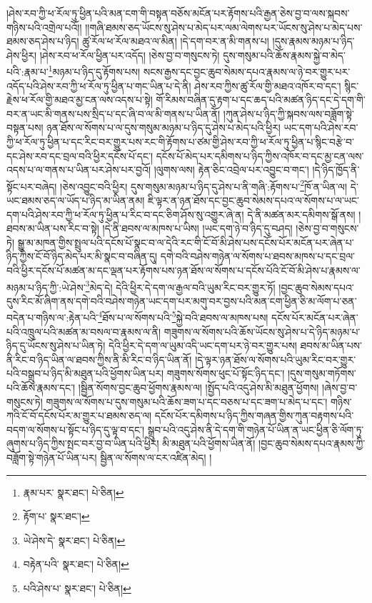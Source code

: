 །ཤེས་རབ་ཀྱི་ཕ་རོལ་ཏུ་ཕྱིན་པའི་མན་ངག་གི་བསྟན་བཅོས་མངོན་པར་རྟོགས་པའི་རྒྱན་ཅེས་བྱ་བ་ལས་སྐབས་གཉིས་པའི་འགྲེལ་པའོ།། །།གཞི་ཐམས་ཅད་ཡོངས་སུ་ཤེས་པ་མེད་པར་ལམ་ལེགས་པར་ཡོངས་སུ་ཤེས་པ་མེད་པས་ཐམས་ཅད་ཤེས་པ་ཉིད། ཚུ་རོལ་ཕ་རོལ་མཐའ་ལ་མིན། །དེ་དག་བར་ན་མི་གནས་པ། །དུས་རྣམས་མཉམ་པ་ཉིད་ཤེས་ཕྱིར། །ཤེས་རབ་ཕ་རོལ་ཕྱིན་པར་འདོད། །ཅེས་བྱ་བ་གསུངས་ཏེ། དུས་གསུམ་པའི་ཆོས་རྣམས་སྐྱེ་བ་མེད་པའི་:རྣམ་པ་\footnote{རྣམ་པར་  སྣར་ཐང་།  པེ་ཅིན། }མཉམ་པ་ཉིད་དུ་རྟོགས་པས། སངས་རྒྱས་དང་བྱང་ཆུབ་སེམས་དཔའ་རྣམས་ལ་ཉེ་བར་གྱུར་པར་འདོད་པའི་ཤེས་རབ་ཀྱི་ཕ་རོལ་ཏུ་ཕྱིན་པ་གང་ཡིན་པ་དེ་ནི། ཤེས་རབ་ཀྱིས་ཚུ་རོལ་གྱི་མཐའ་འཁོར་བ་དང་། སྙིང་རྗེས་ཕ་རོལ་གྱི་མཐའ་མྱ་ངན་ལས་འདས་པ་སྟེ། གོ་རིམས་བཞིན་དུ་རྟག་པ་དང་ཆད་པའི་མཚན་ཉིད་དང་དེ་དག་གི་བར་ན་ཡང་མི་གནས་པས་སྲིད་པ་དང་ཞི་བ་ལ་མི་གནས་པ་ཡིན་ནོ། །ཀུན་ཤེས་པ་ཉིད་ཀྱི་སྐབས་ལས་བཟློག་སྟེ་བསྟན་པས། ཉན་ཐོས་ལ་སོགས་པ་ལ་དུས་གསུམ་མཉམ་པ་ཉིད་དུ་ཤེས་པ་མེད་པའི་ཕྱིར། ཡང་དག་པའི་ཤེས་རབ་ཀྱི་ཕ་རོལ་ཏུ་ཕྱིན་པ་དང་རིང་བར་གྱུར་པས་རང་གི་རྟོགས་པ་ཙམ་གྱི་ཤེས་རབ་ཀྱི་ཕ་རོལ་ཏུ་ཕྱིན་པ་སྙིང་བརྩེ་བ་དང་ཤེས་རབ་དང་བྲལ་བའི་ཕྱིར་དངོས་པོ་དང་། དངོས་པོ་མེད་པར་དམིགས་པ་ཉིད་ཀྱིས་འཁོར་བ་དང་མྱ་ངན་ལས་འདས་པ་ལ་གནས་པ་ཡིན་པར་ཤེས་པར་བྱའོ། །ལུགས་ལས། རྟེན་ཅིང་འབྲེལ་པར་འབྱུང་བ་གང་། །དེ་ཉིད་ཁྱོད་ནི་སྟོང་པར་བཞེད། །ཅེས་འབྱུང་བའི་ཕྱིར། དུས་གསུམ་མཉམ་པ་ཉིད་དུ་ཤེས་པ་ནི་གཞི་:རྟོགས་པ་\footnote{རྟོག་པ་  སྣར་ཐང་། }ཁོ་ན་ཡིན་ལ། དེ་ཡང་ཐམས་ཅད་ལ་ཡོད་པ་ཉིད་མ་ཡིན་ནམ། ཇི་ལྟར་ན་ཉན་ཐོས་དང་བྱང་ཆུབ་སེམས་དཔའ་ལ་སོགས་པ་ལ་ཡང་དག་པའི་ཤེས་རབ་ཀྱི་ཕ་རོལ་ཏུ་ཕྱིན་པ་རིང་བ་དང་ཅིག་ཤོས་སུ་འགྱུར་ཞེ་ན། དེ་ནི་མཚན་མར་དམིགས་སྒོ་ནས། །ཐབས་མ་ཡིན་པས་རིང་བ་སྟེ། །དེ་ནི་ཐབས་ལ་མཁས་པ་ཡིས། །ཡང་དག་ཉེ་བ་ཉིད་དུ་བཤད། །ཅེས་བྱ་བ་གསུངས་ཏེ། སྒྱུ་མ་མཁན་གྱིས་སྤྲུལ་པའི་དངོས་པོ་སྣང་བ་ལ་དེའི་རང་གི་ངོ་བོ་མི་ཤེས་པས་དངོས་པོར་མངོན་པར་ཞེན་པ་ཉིད་ཀྱིས་ངོ་བོ་ཉིད་མེད་པར་མི་སྣང་བ་བཞིན་དུ། དགེ་བའི་བཤེས་གཉེན་ལ་སོགས་པ་ཐབས་མཁས་པ་དང་བྲལ་བའི་ཕྱིར་དངོས་པོ་མཚན་མ་དང་ལྡན་པར་རྟོགས་པས་ཉན་ཐོས་ལ་སོགས་པ་དངོས་པོའི་ངོ་བོ་མི་ཤེས་པ་རྣམས་ལ་མཉམ་པ་ཉིད་ཀྱི་:ཡེ་ཤེས་\footnote{ཡེ་ཤེས་དེ་  སྣར་ཐང་།  པེ་ཅིན། }མེད་དེ། དེའི་ཕྱིར་དེ་དག་ལ་རྒྱལ་བའི་ཡུམ་རིང་བར་གྱུར་ཏོ། །བྱང་ཆུབ་སེམས་དཔའ་དུས་རིང་མོ་ཞིག་ནས་དགེ་བའི་བཤེས་གཉེན་ཡང་དག་པར་མགུ་བར་བྱས་པའི་མན་ངག་ཕྱིན་ཅི་མ་ལོག་པ་ཅན་བདེན་པ་གཉིས་ལ་:རྟེན་པའི་\footnote{བརྟེན་པའི་  སྣར་ཐང་།  པེ་ཅིན། }ཐོས་པ་ལ་སོགས་པའི་\footnote{པའི་ཤེས་པ་  སྣར་ཐང་།  པེ་ཅིན། }སྐྱེ་བའི་ཐབས་ལ་མཁས་པས། དངོས་པོར་མངོན་པར་ཞེན་པའི་འཁྲུལ་པའི་མཚན་མ་བསལ་བ་རྣམས་ལ་ནི། གཟུགས་ལ་སོགས་པའི་ཆོས་ཡོངས་སུ་ཤེས་པ་དེ་ཉིད་མཉམ་པ་ཉིད་དུ་ཡོངས་སུ་ཤེས་པ་ཡིན་ཏེ། དེའི་ཕྱིར་དེ་དག་ལ་ཡུམ་འདི་ཡང་དག་པར་ཉེ་བར་གྱུར་པས། ཐབས་མ་ཡིན་པས་ནི་རིང་བ་ཉིད་ཡིན་ལ་ཐབས་ཀྱིས་ནི་མི་རིང་བ་ཉིད་ཡིན་ནོ། །དེ་ལྟར་ཉན་ཐོས་ལ་སོགས་པའི་ཡུམ་རིང་བར་གྱུར་པའི་བསྒྲུབ་པ་ཉིད་མི་མཐུན་པའི་ཕྱོགས་ཡིན་པར། གཟུགས་སོགས་ཕུང་པོ་སྟོང་ཉིད་དང་། །དུས་གསུམ་གཏོགས་པའི་ཆོས་རྣམས་དང་། །སྦྱིན་སོགས་བྱང་ཆུབ་ཕྱོགས་རྣམས་ལ། །སྤྱོད་པའི་འདུ་ཤེས་མི་མཐུན་ཕྱོགས། །ཞེས་བྱ་བ་གསུངས་ཏེ། གཟུགས་ལ་སོགས་པ་དུས་གསུམ་པའི་ཆོས་ཟག་པ་དང་བཅས་པ་དང་ཟག་པ་མེད་པ་དང་། གཉིས་ཀའི་ངོ་བོ་དངོས་པོར་མ་གྱུར་པ་ཐམས་ཅད་ལ། དངོས་པོར་དམིགས་པ་ཉིད་ཀྱིས་གཞན་གྱིས་ཀུན་བརྟགས་པའི་བདག་ལ་སོགས་པ་སྟོང་པ་ཉིད་དུ་ལྟ་བ་དང་། སྒྲུབ་པའི་འདུ་ཤེས་ནི་དེ་དག་གི་གཉེན་པོ་ཡིན་ན་ཡང་ཕྱིན་ཅི་ལོག་ཏུ་ཞུགས་པ་ཉིད་ཀྱིས་སྤང་བར་བྱ་བ་ཡིན་པའི་ཕྱིར། མི་མཐུན་པའི་ཕྱོགས་ཡིན་ནོ། །བྱང་ཆུབ་སེམས་དཔའ་རྣམས་ཀྱི་བཟློག་སྟེ་གཉེན་པོ་ཡིན་པར། སྦྱིན་ལ་སོགས་ལ་ངར་འཛིན་མེད། །
